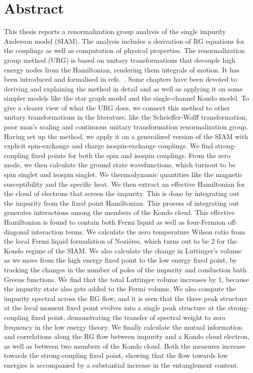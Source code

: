 \chapter*{Abstract}
This thesis reports a renormalization group analysis of the single impurity Anderson model (SIAM). The analysis includes a derivation of RG equations for the couplings as well as computation of physical properties. The renormalization group method (URG) is based on unitary transformations that decouple high energy nodes from the Hamiltonian, rendering them integrals of motion. It has been introduced and formalised in refs.~\cite{anirbanurg1,anirbanurg2,anirbanmott1,anirbanmott2}. Some chapters have been devoted to deriving and explaining the method in detail and as well as applying it on some simpler models like the star graph model and the single-channel Kondo model. To give a clearer view of what the URG does, we connect this method to other unitary transformations in the literature, like the Schrieffer-Wolff transformation, poor man's scaling and continuous unitary transformation renormalization group. Having set up the method, we apply it on a generalized version of the SIAM with explicit spin-exchange and charge isospin-exchange couplings. We find strong-coupling fixed points for both the spin and isospin couplings. From the zero mode, we then calculate the ground state wavefunctions, which turnout to be spin singlet and isospin singlet. We thermodynamic quantities like the magnetic susceptibility and the specific heat. We then extract an effective Hamiltonian for the cloud of electrons that screen the impurity. This is done by integrating out the impurity from the fixed point Hamiltonian. This process of integrating out generates interactions among the members of the Kondo cloud. This effective Hamiltonian is found to contain both Fermi liquid as well as four-Fermion off-diagonal interaction terms. We calculate the zero temperature Wilson ratio from the local Fermi liquid formulation of Nozières, which turns out to be 2 for the Kondo regime of the SIAM. We also calculate the change in Luttinger's volume as we move from the high energy fixed point to the low energy fixed point, by tracking the changes in the number of poles of the impurity and conduction bath Greens functions. We find that the total Luttinger volume increases by 1, because the impurity state also gets added to the Fermi volume. We also compute the impurity spectral across the RG flow, and it is seen that the three peak structure at the local moment fixed point evolves into a single peak structure at the strong-coupling fixed point, demonstrating the transfer of spectral weight to zero frequency in the low energy theory. We finally calculate the mutual information and correlations along the RG flow between impurity and a Kondo cloud electron, as well as between two members of the Kondo cloud. Both the measures increase towards the strong-coupling fixed point, showing that the flow towards low energies is accompanied by a substantial increase in the entanglement content.

\listoffigures
\tableofcontents
